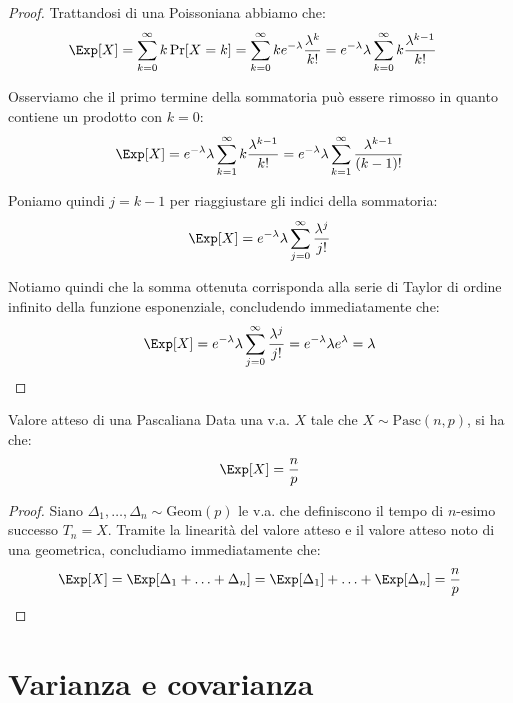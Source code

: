 \documentclass[a4paper, 12pt]{report}
\begin{document}
    \begin{proof}
        Trattandosi di una Poissoniana abbiamo che:
        \[\begin{split}
            \Exp[X] &= \sum_{k=0}^{\infty} k \Pr[X = k] = \sum_{k=0}^{\infty} k e^{-\lambda} \frac{\lambda^k}{k!} = e^{-\lambda} \lambda \sum_{k=0}^{\infty} k  \frac{\lambda^{k-1}}{k!}
        \end{split}\]

        Osserviamo che il primo termine della sommatoria può essere rimosso in quanto contiene un prodotto con $k = 0$: 
        \[\begin{split}
            \Exp[X] &= e^{-\lambda} \lambda \sum_{k=1}^{\infty} k  \frac{\lambda^{k-1}}{k!} = e^{-\lambda} \lambda \sum_{k=1}^{\infty} \frac{\lambda^{k-1}}{(k-1)!} \\
        \end{split}\]

        Poniamo quindi $j = k-1$ per riaggiustare gli indici della sommatoria:
        \[\Exp[X] = e^{-\lambda} \lambda \sum_{j=0}^{\infty} \frac{\lambda^{j}}{j!}\]
        
        Notiamo quindi che la somma ottenuta corrisponda alla serie di Taylor di ordine infinito della funzione esponenziale, concludendo immediatamente che:
        \[ \Exp[X] = e^{-\lambda} \lambda \sum_{j=0}^{\infty} \frac{\lambda^{j}}{j!} = e^{-\lambda} \lambda e^{\lambda} = \lambda \]
    \end{proof}

    \begin{framedprop}{Valore atteso di una Pascaliana}
        Data una v.a. $X$ tale che $X \sim \mathrm{Pasc}(n,p)$, si ha che:
        \[\Exp[X] = \frac{n}{p}\]
    \end{framedprop}

    \begin{proof}
        Siano $\Delta_1, \ldots, \Delta_n \sim \mathrm{Geom}(p)$ le v.a. che definiscono il tempo di $n$-esimo successo $T_n = X$. Tramite la linearità del valore atteso e il valore atteso noto di una geometrica, concludiamo immediatamente che:
        \[\Exp[X] = \Exp[\Delta_1 + \ldots + \Delta_n] = \Exp[\Delta_1] + \ldots + \Exp[\Delta_n] = \frac{n}{p}\]
    \end{proof}

    \section{Varianza e covarianza}
\end{document}

